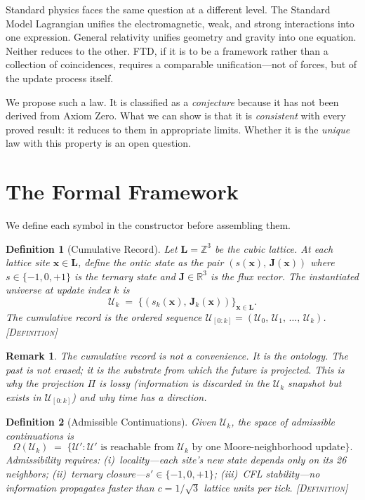 \documentclass[11pt,a4paper]{article}
\newcommand{\ZZ}{\mathbb{Z}}
\newcommand{\RR}{\mathbb{R}}
\newcommand{\UU}{\mathcal{U}}
\newcommand{\OO}{\Omega}
\newcommand{\etag}[1]{{\normalfont\textsc{\footnotesize [#1]}}}
\theoremstyle{compact}
\newtheorem{definition}{Definition}
\newtheorem*{remark}{Remark}
\begin{document}
Standard physics faces the same question at a different level. The Standard Model Lagrangian unifies the electromagnetic, weak, and strong interactions into one expression. General relativity unifies geometry and gravity into one equation. Neither reduces to the other. FTD, if it is to be a framework rather than a collection of coincidences, requires a comparable unification---not of forces, but of the update process itself.

We propose such a law. It is classified as a \emph{conjecture} because it has not been derived from Axiom Zero. What we can show is that it is \emph{consistent} with every proved result: it reduces to them in appropriate limits. Whether it is the \emph{unique} law with this property is an open question.


\section{The Formal Framework}
\label{sec:framework}

We define each symbol in the constructor before assembling them.

\begin{definition}[Cumulative Record]
\label{def:record}
Let $\mathbf{L} = \ZZ^3$ be the cubic lattice. At each lattice site $\mathbf{x} \in \mathbf{L}$, define the \emph{ontic state} as the pair $(s(\mathbf{x}),\, \mathbf{J}(\mathbf{x}))$ where $s \in \{-1, 0, +1\}$ is the ternary state and $\mathbf{J} \in \RR^3$ is the flux vector. The \emph{instantiated universe at update index $k$} is
\[
\UU_k \;=\; \bigl\{(s_k(\mathbf{x}),\, \mathbf{J}_k(\mathbf{x}))\bigr\}_{\mathbf{x} \in \mathbf{L}}.
\]
The \emph{cumulative record} is the ordered sequence $\UU_{[0:k]} = (\UU_0,\, \UU_1,\, \ldots,\, \UU_k)$. \etag{Definition}
\end{definition}

\begin{remark}
The cumulative record is not a convenience. It is the ontology. The past is not erased; it is the substrate from which the future is projected. This is why the projection $\Pi$ is lossy (information is discarded in the $\UU_k$ snapshot but exists in $\UU_{[0:k]}$) and why time has a direction.
\end{remark}

\begin{definition}[Admissible Continuations]
\label{def:continuations}
Given $\UU_k$, the space of \emph{admissible continuations} is
\[
\OO(\UU_k) \;=\; \bigl\{\UU' : \UU' \text{ is reachable from } \UU_k \text{ by one Moore-neighborhood update}\bigr\}.
\]
Admissibility requires: (i)~locality---each site's new state depends only on its 26 neighbors; (ii)~ternary closure---$s' \in \{-1, 0, +1\}$; (iii)~CFL stability---no information propagates faster than $c = 1/\sqrt{3}$ lattice units per tick. \etag{Definition}
\end{definition}
\end{document}
